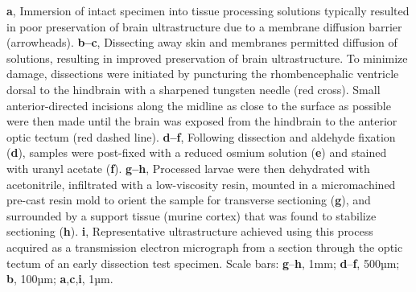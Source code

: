 \documentclass{article}
\begin{document}
\noindent\textbf{a}, Immersion of intact specimen into tissue processing solutions typically resulted in poor preservation of brain ultrastructure due to a membrane diffusion barrier (arrowheads). \textbf{b–c}, Dissecting away skin and membranes permitted diffusion of solutions, resulting in improved preservation of brain ultrastructure. To minimize damage, dissections were initiated by puncturing the rhombencephalic ventricle dorsal to the hindbrain with a sharpened tungsten needle (red cross). Small anterior-directed incisions along the midline as close to the surface as possible were then made until the brain was exposed from the hindbrain to the anterior optic tectum (red dashed line). \textbf{d–f}, Following dissection and aldehyde fixation (\textbf{d}), samples were post-fixed with a reduced osmium solution (\textbf{e}) and stained with uranyl acetate (\textbf{f}). \textbf{g–h}, Processed larvae were then dehydrated with acetonitrile, infiltrated with a low-viscosity resin, mounted in a
micromachined pre-cast resin mold to orient the sample for transverse sectioning (\textbf{g}), and surrounded by a support tissue (murine cortex) that was found to stabilize sectioning (\textbf{h}). \textbf{i}, Representative ultrastructure achieved using this process acquired as a transmission electron micrograph from a section through the optic tectum of an early dissection test specimen. Scale bars: \textbf{g}–\textbf{h}, 1mm; \textbf{d}–\textbf{f}, 500µm; \textbf{b}, 100µm; \textbf{a},\textbf{c},\textbf{i}, 1µm.
\end{document}
